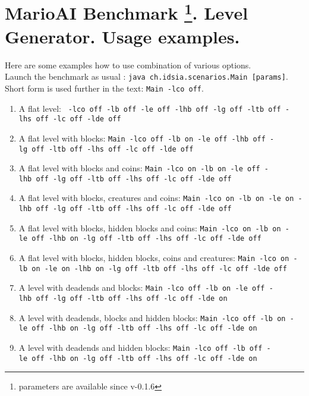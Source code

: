 \documentclass{report}
\begin{document}
\section*{MarioAI Benchmark \footnote{parameters are available since v-0.1.6}. Level Generator. Usage examples.}
Here are some examples how to use combination of various options. \\
Launch the benchmark as usual : \texttt{java~ch.idsia.scenarios.Main [params]}. \\ Short form is used further in the text: \texttt{Main -lco off}.
\begin{enumerate}
\item A flat level: \newline %
\texttt{~-lco~off~-lb~off~-le~off~-lhb~off~-lg~off~-ltb~off~-lhs~off~-lc~off~-lde~off}
\item A flat level with blocks:\newline %
\texttt{Main~-lco~off~-lb~on~-le~off~-lhb~off~-lg~off~-ltb~off~-lhs~off~-lc~off~-lde~off}
\item A flat level with blocks and coins:\newline %
\texttt{Main~-lco~on~-lb~on~-le~off~-lhb~off~-lg~off~-ltb~off~-lhs~off~-lc~off~-lde~off}
\item A flat level with blocks, creatures and coins:\newline %
\texttt{Main~-lco~on~-lb~on~-le~on~-lhb~off~-lg~off~-ltb~off~-lhs~off~-lc~off~-lde~off}
\item A flat level with blocks, hidden blocks and coins:\newline %
\texttt{Main~-lco~on~-lb~on~-le~off~-lhb~on~-lg~off~-ltb~off~-lhs~off~-lc~off~-lde~off}
\item A flat level with blocks, hidden blocks, coins and creatures:\newline %
\texttt{Main~-lco~on~-lb~on~-le~on~-lhb~on~-lg~off~-ltb~off~-lhs~off~-lc~off~-lde~off}
\item A level with deadends  and blocks:\newline %
\texttt{Main~-lco~off~-lb~on~-le~off~-lhb~off~-lg~off~-ltb~off~-lhs~off~-lc~off~-lde~on}
\item A level with deadends, blocks and hidden blocks:\newline %
\texttt{Main~-lco~off~-lb~on~-le~off~-lhb~on~-lg~off~-ltb~off~-lhs~off~-lc~off~-lde~on}
\item A level with deadends and hidden blocks:\newline %
\texttt{Main~-lco~off~-lb~off~-le~off~-lhb~on~-lg~off~-ltb~off~-lhs~off~-lc~off~-lde~on}

\end{enumerate}
\end{document}
